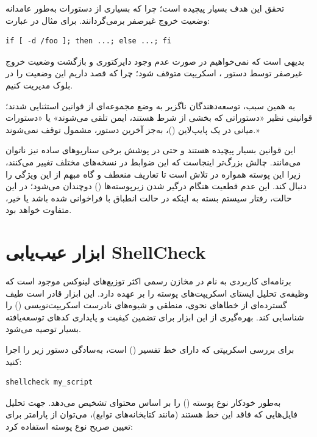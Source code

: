 تحقق این هدف بسیار پیچیده است؛ چرا که بسیاری از دستورات به‌طور عامدانه وضعیت خروج غیرصفر برمی‌گردانند. برای مثال در عبارت:

\begin{latin}
\begin{lstlisting}
if [ -d /foo ]; then ...; else ...; fi
\end{lstlisting}
\end{latin}

بدیهی است که نمی‌خواهیم در صورت عدم وجود دایرکتوری و بازگشت وضعیت خروج غیرصفر توسط دستور \cmd{[ -d /foo ]}، اسکریپت متوقف شود؛ چرا که قصد داریم این وضعیت را در بلوک  مدیریت کنیم.

به همین سبب، توسعه‌دهندگان ناگزیر به وضع مجموعه‌ای از قوانین استثنایی شدند؛ قوانینی نظیر «دستوراتی که بخشی از شرط  هستند، ایمن تلقی می‌شوند» یا «دستورات میانی در یک پایپ‌لاین ()، به‌جز آخرین دستور، مشمول توقف نمی‌شوند.»

این قوانین بسیار پیچیده هستند و حتی در پوشش برخی سناریوهای ساده نیز ناتوان می‌مانند. چالش بزرگ‌تر اینجاست که این ضوابط در نسخه‌های مختلف  تغییر می‌کنند، زیرا این پوسته همواره در تلاش است تا تعاریف منعطف و گاه مبهم  از این ویژگی را دنبال کند. این عدم قطعیت هنگام درگیر شدن زیرپوسته‌ها () دوچندان می‌شود؛ در این حالت، رفتار سیستم بسته به اینکه  در حالت انطباق با  فراخوانی شده باشد یا خیر، متفاوت خواهد بود.

\section{ابزار عیب‌یابی ShellCheck}

برنامه‌ای کاربردی به نام  در مخازن رسمی اکثر توزیع‌های لینوکس موجود است که وظیفه‌ی تحلیل ایستای اسکریپت‌های پوسته را بر عهده دارد. این ابزار قادر است طیف گسترده‌ای از خطاهای نحوی، منطقی و شیوه‌های نادرست اسکریپت‌نویسی () را شناسایی کند. بهره‌گیری از این ابزار برای تضمین کیفیت و پایداری کدهای توسعه‌یافته بسیار توصیه می‌شود.

برای بررسی اسکریپتی که دارای خط تفسیر () است، به‌سادگی دستور زیر را اجرا کنید:

\begin{latin}
\begin{lstlisting}
shellcheck my_script
\end{lstlisting}
\end{latin}

 به‌طور خودکار نوع پوسته () را بر اساس محتوای  تشخیص می‌دهد. جهت تحلیل فایل‌هایی که فاقد این خط هستند (مانند کتابخانه‌های توابع)، می‌توان از پارامتر  برای تعیین صریح نوع پوسته استفاده کرد:

